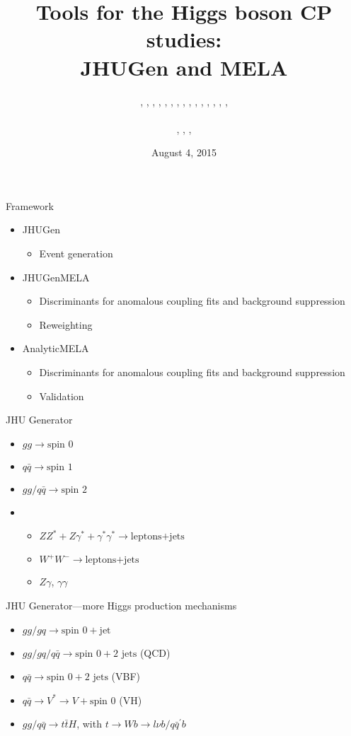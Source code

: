 \documentclass[usenames,dvipsnames,svgnames,table]{beamer}
\title[JHUGen and MELA]{Tools for the Higgs boson CP studies: \\ JHUGen and MELA}
\author[Heshy Roskes]{\CMS{I. Anderson}, \Sara{S. Bolognesi}, \theory{F. Caola}, \ATLAS{Y. Gao}, \CMS{A. Gritsan}, \CMS{C. Martin}, \theory{Z. Guo}, \theory{K. Melnikov}, \me{H. Roskes}, \CMS{U. Sarica}, \theory{M. Schulze}, \CMS{N. Tran}, \CMS{A. Whitbeck}, \CMS{M. Xiao}, \CMS{C. You}, \theory{Y. Zhou}
\texorpdfstring{\\ \leavevmode
\\
\ATLAS{ATLAS}, \CMS{CMS}, \theory{theory}, \Sara{where is Sara?}}{}}
\date{August 4, 2015}
\newcommand{\spin}[1]{\text{spin }#1}
\begin{document}
\begin{frame}
\titlepage
\end{frame}

\begin{frame}{Framework}

\begin{itemize}
\item JHUGen
\begin{itemize}
\item Event generation
\end{itemize}
\item JHUGenMELA
\begin{itemize}
\item Discriminants for anomalous coupling fits and background suppression
\item Reweighting
\end{itemize}
\item AnalyticMELA
\begin{itemize}
\item Discriminants for anomalous coupling fits and background suppression
\item Validation
\end{itemize}
\end{itemize}

\end{frame}


\begin{frame}{JHU Generator}
\begin{itemize}
\item $gg\rightarrow\spin{0}$
\item $q\bar{q}\rightarrow\spin{1}$
\item $gg/q\bar{q}\rightarrow\spin{2}$
\end{itemize}
\begin{itemize}
\item
\begin{itemize}[label={$\rightarrow$}]
\item $ZZ^*+Z\gamma^*+\gamma^*\gamma^*\rightarrow \text{leptons+jets}$
\item $W^+W^-\rightarrow \text{leptons+jets}$
\item $Z\gamma$, $\gamma\gamma$
\end{itemize}
\end{itemize}
\end{frame}

\begin{frame}{JHU Generator---more Higgs production mechanisms}
\begin{itemize}
\item $gg/gq\rightarrow\spin{0}+\text{jet}$
\item $gg/gq/q\bar{q}\rightarrow\spin{0}+2\text{ jets}$ (QCD)
\item $q\bar{q}\rightarrow\spin{0}+2\text{ jets}$ (VBF)
\item $q\bar{q}\rightarrow V^*\rightarrow V+\spin{0}$ (VH)
\item $gg/q\bar{q}\rightarrow t\bar{t}H$, with $t\rightarrow Wb \rightarrow l\nu b/q\bar{q}^\prime b$
\end{itemize}
\end{frame}
\end{document}
